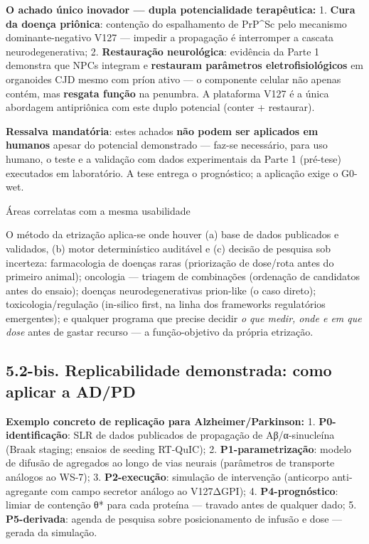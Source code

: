 \documentclass[12pt,a4paper,oneside]{report}
\begin{document}
\textbf{O achado único inovador --- dupla potencialidade terapêutica:}
1. \textbf{Cura da doença priônica}: contenção do espalhamento de
PrP\^{}Sc pelo mecanismo dominante-negativo V127 --- impedir a
propagação é interromper a cascata neurodegenerativa; 2.
\textbf{Restauração neurológica}: evidência da Parte 1 demonstra que
NPCs integram e \textbf{restauram parâmetros eletrofisiológicos} em
organoides CJD mesmo com príon ativo --- o componente celular não apenas
contém, mas \textbf{resgata função} na penumbra. A plataforma V127 é a
única abordagem antipriônica com este duplo potencial (conter +
restaurar).

\textbf{Ressalva mandatória}: estes achados \textbf{não podem ser
aplicados em humanos} apesar do potencial demonstrado --- faz-se
necessário, para uso humano, o teste e a validação com dados
experimentais da Parte 1 (pré-tese) executados em laboratório. A tese
entrega o prognóstico; a aplicação exige o G0-wet.

Áreas correlatas com a mesma usabilidade

O método da etrização aplica-se onde houver (a) base de dados publicados
e validados, (b) motor determinístico auditável e (c) decisão de
pesquisa sob incerteza: farmacologia de doenças raras (priorização de
dose/rota antes do primeiro animal); oncologia --- triagem de
combinações (ordenação de candidatos antes do ensaio); doenças
neurodegenerativas prion-like (o caso direto); toxicologia/regulação
(in-silico first, na linha dos frameworks regulatórios emergentes); e
qualquer programa que precise decidir \emph{o que medir, onde e em que
dose} antes de gastar recurso --- a função-objetivo da própria
etrização.

\hypertarget{bis.-replicabilidade-demonstrada-como-aplicar-a-adpd}{%
\subsection{5.2-bis. Replicabilidade demonstrada: como aplicar a
AD/PD}\label{bis.-replicabilidade-demonstrada-como-aplicar-a-adpd}}

\textbf{Exemplo concreto de replicação para Alzheimer/Parkinson:} 1.
\textbf{P0-identificação}: SLR de dados publicados de propagação de
Aβ/α-sinucleína (Braak staging; ensaios de seeding RT-QuIC); 2.
\textbf{P1-parametrização}: modelo de difusão de agregados ao longo de
vias neurais (parâmetros de transporte análogos ao WS-7); 3.
\textbf{P2-execução}: simulação de intervenção (anticorpo anti-agregante
com campo secretor análogo ao V127ΔGPI); 4. \textbf{P4-prognóstico}:
limiar de contenção θ* para cada proteína --- travado antes de qualquer
dado; 5. \textbf{P5-derivada}: agenda de pesquisa sobre posicionamento
de infusão e dose --- gerada da simulação.
\end{document}

